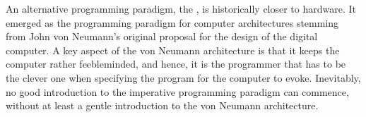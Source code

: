 An alternative programming paradigm, the , is historically
closer to hardware. It emerged as the programming paradigm for computer
architectures stemming from John von Neumann's original proposal for the design
of the digital computer\cite{von-neumann}.  A key aspect of the von Neumann
architecture is that it keeps the computer rather feebleminded, and hence, it
is the programmer that has to be the clever one when specifying the program for
the computer to evoke. Inevitably, no good introduction to the imperative
programming paradigm can commence, without at least a gentle introduction to
the von Neumann architecture.
